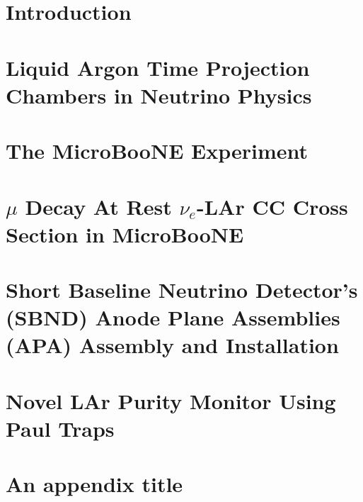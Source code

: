 \documentclass[twoside,openright,12pt,a4paper]{report}
\begin{document}
\capa
\folhadeaprovacao
\adedicatoria
\notaagradecimento
\acitacao
\tableofcontents
\listoffigures 
\listoftables
\linenumbers

\inicio

\chapter{Introduction}


\chapter{Liquid Argon Time Projection Chambers in Neutrino Physics}


\chapter{The MicroBooNE Experiment}


\chapter{$\mu$ Decay At Rest $\nu_{e}$-LAr CC Cross Section in MicroBooNE}


\chapter{Short Baseline Neutrino Detector's (SBND) Anode Plane Assemblies (APA) Assembly and Installation}


\chapter{Novel LAr Purity Monitor Using Paul Traps}


\appendix %
\isappendixtrue %
\renewcommand\chaptername{Appendix}

\chapter{An appendix title}







\begin{thebibliography}{10}






\end{thebibliography}

\end{document}

